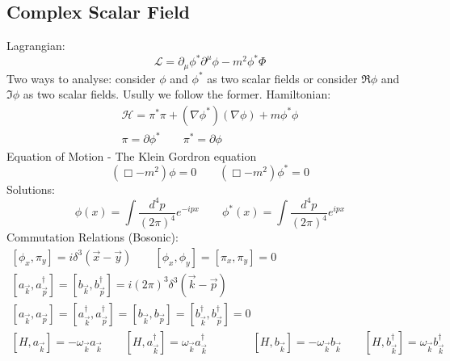 \documentclass{article}
\begin{document}
\subsection{Complex Scalar Field}
Lagrangian:
\begin{equation*}
    \mathcal{L} = \partial_\mu\phi^*\partial^\mu\phi  - m^2\phi^*\Phi
\end{equation*}
Two ways to analyse: consider $\phi$ and $\phi^*$ as two scalar fields or consider $\Re{\phi}$ and $\Im{\phi}$ as two scalar fields. Usully we follow the former.
\newline
Hamiltonian:
\begin{equation*}
\begin{gathered}
    \mathcal{H} = \pi^*\pi + \left(\nabla \phi^*\right)\left(\nabla \phi\right) + m\phi^*\phi
    \\
    \pi = \partial\phi^*
    \qquad
    \pi^* = \partial\phi
\end{gathered}
\end{equation*}
Equation of Motion - The Klein Gordron equation
\begin{equation*}
    \left(\Box - m^2\right)\phi = 0
    \qquad
    \left(\Box - m^2\right)\phi^* = 0
\end{equation*}
Solutions:
\begin{equation*}
    \phi(x) = \int \frac{d^4p}{(2\pi)^4}e^{-ipx}
    \qquad
    \phi^*(x) = \int \frac{d^4p}{(2\pi)^4}e^{ipx}
\end{equation*}
Commutation Relations (Bosonic):
\begin{equation*}
\begin{gathered}
    \left[\phi_x, \pi_y\right] = i\delta^3(\vec{x} - \vec{y})
    \qquad
    \left[\phi_x, \phi_y\right] =
    \left[\pi_x, \pi_y\right] = 0
    \\
    \left[a_{\vec{k}}, a^\dagger_{\vec{p}}\right] =
    \left[b_{\vec{k}}, b^\dagger_{\vec{p}}\right] =
    i\left(2\pi\right)^3\delta^3(\vec{k} - \vec{p})
    \\
    \left[a_{\vec{k}}, a_{\vec{p}}\right] =
    \left[a^\dagger_{\vec{k}}, a^\dagger_{\vec{p}}\right] = 
    \left[b_{\vec{k}}, b_{\vec{p}}\right] =
    \left[b^\dagger_{\vec{k}}, b^\dagger_{\vec{p}}\right] = 0
    \\
    \left[H, a_{\vec{k}}\right] = -\omega_{\vec{k}}a_{\vec{k}}
    \qquad
    \left[H, a^\dagger_{\vec{k}}\right] = \omega_{\vec{k}}a^\dagger_{\vec{k}}
    \qquad \qquad
    \left[H, b_{\vec{k}}\right] = -\omega_{\vec{k}}b_{\vec{k}}
    \qquad
    \left[H, b^\dagger_{\vec{k}}\right] = \omega_{\vec{k}}b^\dagger_{\vec{k}}
\end{gathered}
\end{equation*}
\end{document}
